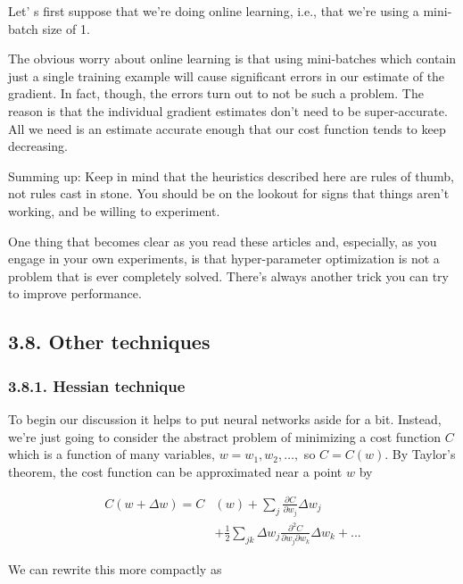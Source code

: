 \documentclass[12 pt]{article}
\begin{document}
Let' s first suppose that we're doing online learning, i.e., that we're
using a mini-batch size of 1.

The obvious worry about online learning is that using mini-batches which
contain just a single training example will cause significant errors in
our estimate of the gradient. In fact, though, the errors turn out to
not be such a problem. The reason is that the individual gradient
estimates don't need to be super-accurate. All we need is an estimate
accurate enough that our cost function tends to keep decreasing.

Summing up: Keep in mind that the heuristics described here are rules of
thumb, not rules cast in stone. You should be on the lookout for signs
that things aren't working, and be willing to experiment.

One thing that becomes clear as you read these articles and, especially,
as you engage in your own experiments, is that hyper-parameter
optimization is not a problem that is ever completely solved. There's
always another trick you can try to improve performance.

\subsection{3.8. Other techniques}
\label{other-techniques}

\subsubsection{3.8.1. Hessian technique}
\label{hessian-technique}

To begin our discussion it helps to put neural networks aside for a bit.
Instead, we're just going to consider the abstract problem of minimizing
a cost function $ C $ which is a function of many variables, $ w =
w_1, w_2, \ldots{}, $ so $ C = C(w) $. By Taylor's theorem, the cost
function can be approximated near a point $ w $ by

\begin{equation}
    \begin{split}
        C(w + \Delta w) =  C&(w)  + \sum_j \frac{\partial C}{\partial w_j}
        \Delta w_j \\ & + \frac{1}{2}\sum_{jk} \Delta w_j
        \frac{\partial^2 C}{\partial w_j \partial w_k} \Delta w_k + ...
    \end{split}
\end{equation}

We can rewrite this more compactly as
\end{document}
